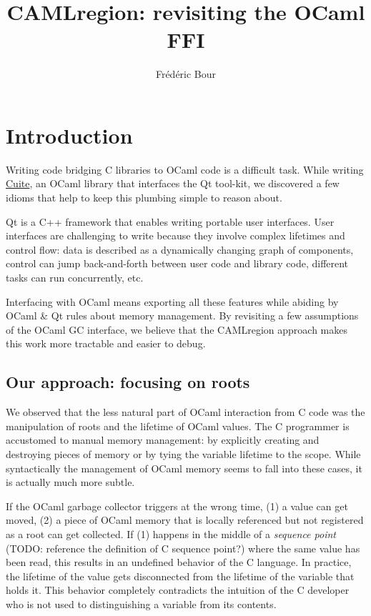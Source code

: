 \documentclass[a4paper]{easychair}
\title{CAMLregion: revisiting the OCaml FFI}
\author{
  Frédéric Bour
}
\institute{
  Facebook --
  \email{def@fb.com}
}
\begin{document}
\maketitle

\section{Introduction}

Writing code bridging C libraries to OCaml code is a difficult task.
While writing \href{https://github.com/let-def/cuite}{Cuite}, an OCaml
library that interfaces the Qt tool-kit, we discovered a few idioms that
help to keep this plumbing simple to reason about.

Qt is a C++ framework that enables writing portable user interfaces.
User interfaces are challenging to write because they involve complex
lifetimes and control flow: data is described as a dynamically changing
graph of components, control can jump back-and-forth between user code
and library code, different tasks can run concurrently, etc.

Interfacing with OCaml means exporting all these features while abiding
by OCaml \& Qt rules about memory management. By revisiting a few
assumptions of the OCaml GC interface, we believe that the CAMLregion 
approach makes this work more tractable and easier to debug.

\subsection{Our approach: focusing on roots}

We observed that the less natural part of OCaml interaction from C code
was the manipulation of roots and the lifetime of OCaml values. The C
programmer is accustomed to manual memory management: by explicitly
creating and destroying pieces of memory or by tying the variable
lifetime to the scope. While syntactically the management of OCaml
memory seems to fall into these cases, it is actually much more subtle.

If the OCaml garbage collector triggers at the wrong time, (1) a value
can get moved, (2) a piece of OCaml memory that is locally referenced
but not registered as a root can get collected. If (1) happens in the
middle of a \emph{sequence point} (TODO: reference the definition of C
sequence point?) where the same value has been read, this results in an
undefined behavior of the C language. In practice, the lifetime of the
value gets disconnected from the lifetime of the variable that holds it.
This behavior completely contradicts the intuition of the C developer
who is not used to distinguishing a variable from its contents.
\end{document}

